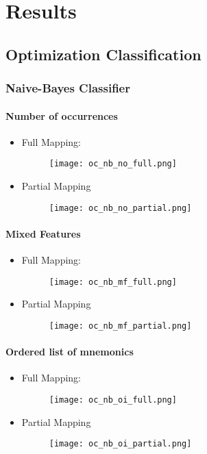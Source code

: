\documentclass[a4paper]{article}
\begin{document}
\section{Results}
\subsection{Optimization Classification}
\subsubsection{Naive-Bayes Classifier}
\paragraph{Number of occurrences}
\begin{itemize}
\item Full Mapping:
\begin{figure} [h!]
  \texttt{[image: oc\_nb\_no\_full.png]}
\end{figure}
\item Partial Mapping
\begin{figure} [h!]
  \texttt{[image: oc\_nb\_no\_partial.png]}
\end{figure}
\end{itemize}

\paragraph{Mixed Features}
\begin{itemize}
\item Full Mapping:
\begin{figure} [h!]
  \texttt{[image: oc\_nb\_mf\_full.png]}
\end{figure}
\item Partial Mapping
\begin{figure} [h!]
  \texttt{[image: oc\_nb\_mf\_partial.png]}
\end{figure}
\end{itemize}

\paragraph{Ordered list of mnemonics}
\begin{itemize}
\item Full Mapping:
\begin{figure} [h!]
  \texttt{[image: oc\_nb\_oi\_full.png]}
\end{figure}
\newpage
\item Partial Mapping
\begin{figure} [h!]
  \texttt{[image: oc\_nb\_oi\_partial.png]}
\end{figure}
\end{itemize}
\end{document}
